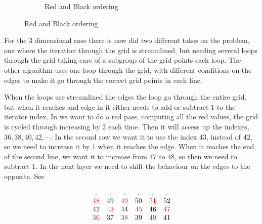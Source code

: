 \begin{figure}
\begin{subfigure}[b]{0.45\textwidth}
			\caption{Red and Black ordering}
			\label{fig:RB_ordering}
			\end{subfigure}
	\end{figure}

	For the 3 dimensional case there is now did two different takes on the problem, one where the iteration through the grid is streamlined, but needing
	several loops through the grid taking care of a subgroup of the grid points each loop. The other algorithm uses one loop through the grid,
	with different conditions on the edges to make it go through the correct grid points in each line.

	When the loops are streamlined the edges the loop go through the entire grid, but when it reaches and edge in it either needs to add or subtract \(1\) to
	the iterator index. In \label{eq:RB_loop} we want to do a red pass, computing all the red values, the grid is cycled through increasing by 2 each time.
	Then it will access up the indexes, \(36, 38, 40,42, \cdots\). In the second row we want it to use the index \(43\), instead of \(42\), so we need to
	increase it by \(1\) when it reaches the edge. When it reaches the end of the second line, we want it to increase from \(47\) to \(48\),
	so then we need to subtract \(1\). In the next layer we need to shift the behaviour on the edges to the opposite. See

	\[
	\begin{matrix}
	.	&	.	&	. &	.	& .	& .
	\\
	\textcolor{red}{48} &49 &\textcolor{red}{49} &50 & \textcolor{red}{51} &52
	\\
	42	& \textcolor{red}{43} &44 &\textcolor{red}{45} &46 &\textcolor{red}{47}
	\\
	\textcolor{red}{36} & 37 &\textcolor{red}{38}  &39 & \textcolor{red}{40} & 41
	\end{matrix}
	\label{eq:RB-loop}
	\]

